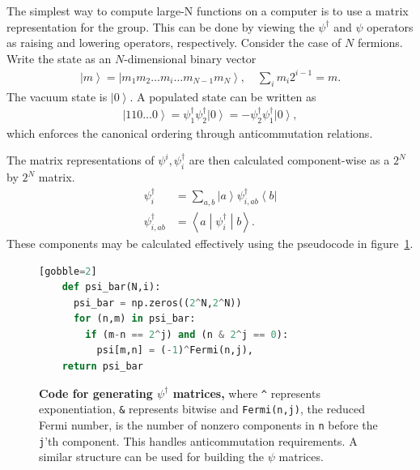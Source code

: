 \documentclass[12pt]{article} %
\newcommand{\ket}[1]{\left|#1\right\rangle}
\newcommand{\bra}[1]{\left\langle#1\right|}
\newcommand{\brakett}[3]{\left\langle#1\middle|#2\middle|#3\right\rangle}
\newcommand{\nn}{\nonumber\\}
\begin{document}
The simplest way to compute large-N functions on a computer is to use a matrix representation for the group. This can be done by viewing the $\psi^\dag$ and $\psi$ operators as raising and lowering operators, respectively. Consider the case of $N$ fermions. Write the state as an $N$-dimensional binary vector
\begin{align}
\ket{m} = \ket{m_1m_2\dots m_i\dots m_{N-1}m_N}, \quad\sum_im_i2^{i-1} =
	m.\label{eqn:2Nstate}
\end{align}
The vacuum state is $\ket{0}$. A populated state can be written as
\begin{align}
\ket{110\dots 0} = \psi^\dag_1\psi^\dag_2 \ket{0} =-\psi^\dag_2\psi^\dag_1\ket{0},
\end{align}
which enforces the canonical ordering through anticommutation relations. 

The matrix representations of $\psi^i, \psi^\dag_i$ are then calculated component-wise as a $2^N$ by $2^N$ matrix.
\begin{align}
\psi^\dag_i &= \sum_{a,b}\ket{a}\psi^\dag_{i,ab}\bra{b}\nn
\psi^\dag_{i,ab} &= \brakett{a}{\psi^\dag_i}{b}.\label{eqn:comps}
\end{align}
These components may be calculated effectively using the pseudocode in figure~\ref{code:psibar}.

\begin{figure}[ht]
	\begin{lstlisting}[language=python][gobble=2]
    def psi_bar(N,i):
      psi_bar = np.zeros((2^N,2^N))
      for (n,m) in psi_bar:
        if (m-n == 2^j) and (n & 2^j == 0): 
          psi[m,n] = (-1)^Fermi(n,j),
    return psi_bar
	\end{lstlisting}
	\cprotect\caption{\textbf{Code for generating $\psi^\dag$ matrices,} where \verb|^| represents exponentiation, \verb|&| represents bitwise and \verb|Fermi(n,j)|, the reduced Fermi number, is the number of nonzero components in \verb|n| before the \verb|j|'th component. This handles anticommutation requirements. A similar structure can be used for building the $\psi$ matrices.}
	\label{code:psibar}
\end{figure}
\end{document}
